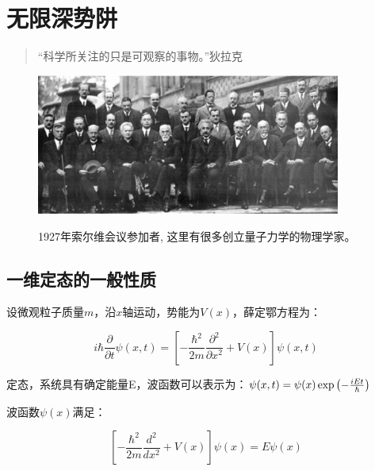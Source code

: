 \section{无限深势阱}


\begin{quotation}
``科学所关注的只是可观察的事物。''\qquad 狄拉克
\end{quotation}


\begin{figure}[h]
\begin{center}
\includegraphics[clip,width=10cm]{1DProblem/1927solvay.ps}\\
\caption{1927年索尔维会议参加者,
这里有很多创立量子力学的物理学家。}\label{1927solvay}
\end{center}
\end{figure}


\subsection{一维定态的一般性质}

设微观粒子质量$m$，沿$x$轴运动，势能为$V(x)$，薛定鄂方程为：

\begin{center}
\begin{equation}
    i\hbar \frac{\partial }{{\partial t}}\psi (x,t) = \left[ { - \frac{{\hbar ^2 }}{{2m}}\frac{{\partial ^2 }}{{\partial x^2 }} + V(x)} \right]\psi (x,t)
\end{equation}
\end{center}

定态，系统具有确定能量E，波函数可以表示为：$\psi (x,t) = \psi (x)\exp \left( { - {\textstyle{{iEt} \over \hbar }}} \right)$

波函数$\psi (x)$满足：

\begin{center}
\begin{equation}
    \left[ { - \frac{{\hbar ^2 }}{{2m}}\frac{{d^2 }}{{dx^2 }} + V(x)} \right]\psi (x) = E\psi (x)
\end{equation}
\end{center}

